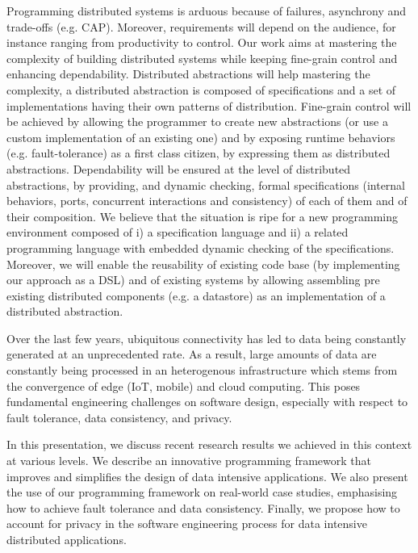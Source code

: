 \documentclass[a4paper,UKenglish]{dagrep-v2018}
\begin{document}
\license

Programming distributed systems is arduous because of failures, asynchrony and trade-offs (e.g. CAP). Moreover, requirements will depend on the audience, for instance ranging from productivity to control.
Our work aims at mastering the complexity of building distributed systems while keeping fine-grain control and enhancing dependability. Distributed abstractions will help mastering the complexity, a distributed abstraction is composed of specifications and a set of implementations having their own patterns of distribution. Fine-grain control will be achieved by allowing the programmer to create new abstractions (or use a custom implementation of an existing one) and by exposing runtime behaviors (e.g. fault-tolerance) as a first class citizen, by expressing them as distributed abstractions. Dependability will be ensured at the level of distributed abstractions, by providing, and dynamic checking, formal specifications (internal behaviors, ports, concurrent interactions and consistency) of each of them and of their composition.
We believe that the situation is ripe for a new programming environment composed of i) a specification language and ii) a related programming language with embedded dynamic checking of the specifications. Moreover, we will enable the reusability of existing code base (by implementing our approach as a DSL) and of existing systems by allowing assembling pre existing distributed components (e.g. a datastore) as an implementation of a distributed abstraction.



\license

Over the last few years, ubiquitous connectivity has led to data being constantly generated at an unprecedented rate. As a result, large amounts of data are constantly being processed in 
an heterogenous infrastructure which stems from the convergence of edge (IoT, mobile) and cloud computing. This poses fundamental engineering challenges on software design, especially with respect to fault tolerance, data consistency, and privacy.

In this presentation, we discuss recent research results we achieved in this context at various levels. We describe an innovative programming framework that improves and simplifies the design of data intensive applications. We also present the use of our programming framework on real-world case studies, emphasising how to achieve fault tolerance and data consistency. Finally, we propose how to account for privacy in the software engineering process for data intensive distributed applications.
\end{document}
